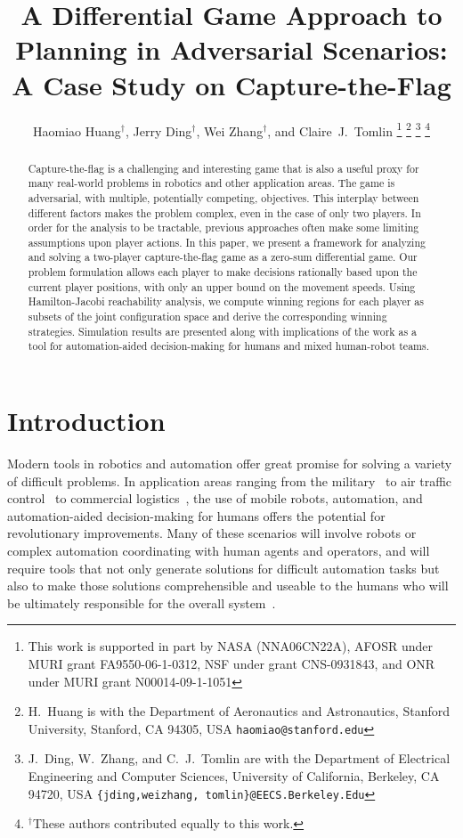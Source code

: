 \documentclass[letterpaper, 10 pt, conference]{ieeeconf}  %
\title{\LARGE \bf
A Differential Game Approach to Planning in Adversarial Scenarios: A Case Study on Capture-the-Flag
}
\author{Haomiao Huang$^\dagger$, Jerry Ding$^\dagger$, Wei Zhang$^\dagger$, and Claire~J.~Tomlin%
\thanks{This work is supported in part by NASA (NNA06CN22A), AFOSR under
MURI grant FA9550-06-1-0312, NSF under grant CNS-0931843, and ONR under MURI grant N00014-09-1-1051}%
\thanks{H.~Huang is with the Department of Aeronautics and Astronautics,
        Stanford University, Stanford, CA 94305, USA
        {\tt\small haomiao@stanford.edu}}                
\thanks{J.~Ding, W.~Zhang, and C.~J.~Tomlin are with the Department of Electrical Engineering and Computer Sciences,
        University of California, Berkeley, CA 94720, USA
        {\tt\small \{jding,weizhang, tomlin\}@EECS.Berkeley.Edu}}
\thanks{$^\dagger$These authors contributed equally to this work.}%
}
\numberwithin{algorithm}{section}
\begin{document}
\maketitle
\thispagestyle{empty}
\pagestyle{empty}


\begin{abstract}
Capture-the-flag is a challenging and interesting game that is also a useful proxy for many real-world problems in robotics and other application areas.  The game is adversarial, with multiple, potentially competing, objectives. This interplay between different factors makes the problem complex, even in the case of only two players.  In order for the analysis to be tractable, previous approaches often make some limiting assumptions upon player actions.  In this paper, we present a framework for analyzing and solving a two-player capture-the-flag game as a zero-sum differential game.  Our problem formulation allows each player to make decisions rationally based upon the current player positions, with only an upper bound on the movement speeds.  Using Hamilton-Jacobi reachability analysis, we compute winning regions for each player as subsets of the joint configuration space and derive the corresponding winning strategies.  Simulation results are presented along with implications of the work as a tool for automation-aided decision-making for humans and mixed human-robot teams.

\end{abstract}

\section{Introduction}
\label{sec:intro}

Modern tools in robotics and automation offer great promise for solving a variety of difficult problems.  In application areas ranging from the military~\cite{OFTHEAIRFORCEWASHINGTON:2009p37} to air traffic control~\cite{Erzberger:2006p44} to commercial logistics~\cite{kiva2009}, the use of mobile robots, automation, and automation-aided decision-making for humans offers the potential for revolutionary improvements.  Many of these scenarios will involve robots or complex automation coordinating with human agents and operators, and will require tools that not only generate solutions for difficult automation tasks but also to make those solutions comprehensible and useable to the humans who will be ultimately responsible for the overall system~\cite{Axe:2007p9,Metzger:2001p60}.
\end{document}
